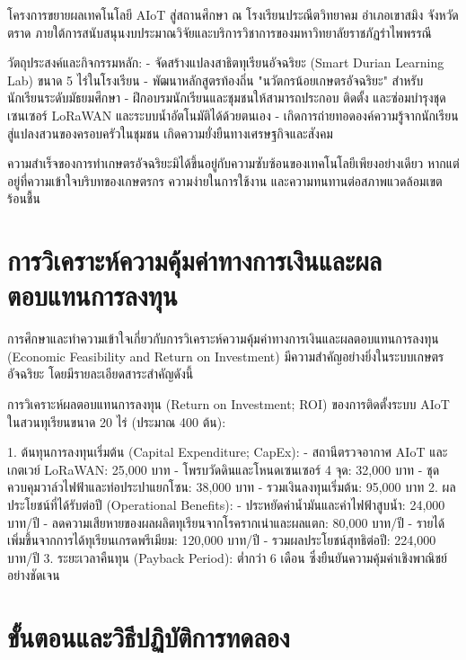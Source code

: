 โครงการขยายผลเทคโนโลยี AIoT สู่สถานศึกษา ณ โรงเรียนประณีตวิทยาคม อำเภอเขาสมิง จังหวัดตราด ภายใต้การสนับสนุนงบประมาณวิจัยและบริการวิชาการของมหาวิทยาลัยราชภัฏรำไพพรรณี

วัตถุประสงค์และกิจกรรมหลัก:
- จัดสร้างแปลงสาธิตทุเรียนอัจฉริยะ (Smart Durian Learning Lab) ขนาด 5 ไร่ในโรงเรียน
- พัฒนาหลักสูตรท้องถิ่น "นวัตกรน้อยเกษตรอัจฉริยะ" สำหรับนักเรียนระดับมัธยมศึกษา
- ฝึกอบรมนักเรียนและชุมชนให้สามารถประกอบ ติดตั้ง และซ่อมบำรุงชุดเซนเซอร์ LoRaWAN และระบบน้ำอัตโนมัติได้ด้วยตนเอง
- เกิดการถ่ายทอดองค์ความรู้จากนักเรียนสู่แปลงสวนของครอบครัวในชุมชน เกิดความยั่งยืนทางเศรษฐกิจและสังคม

\begin{casebox}
ความสำเร็จของการทำเกษตรอัจฉริยะมิได้ขึ้นอยู่กับความซับซ้อนของเทคโนโลยีเพียงอย่างเดียว หากแต่อยู่ที่ความเข้าใจบริบทของเกษตรกร ความง่ายในการใช้งาน และความทนทานต่อสภาพแวดล้อมเขตร้อนชื้น
\end{casebox}

\section{การวิเคราะห์ความคุ้มค่าทางการเงินและผลตอบแทนการลงทุน}

การศึกษาและทำความเข้าใจเกี่ยวกับการวิเคราะห์ความคุ้มค่าทางการเงินและผลตอบแทนการลงทุน (Economic Feasibility and Return on Investment) มีความสำคัญอย่างยิ่งในระบบเกษตรอัจฉริยะ โดยมีรายละเอียดสาระสำคัญดังนี้

การวิเคราะห์ผลตอบแทนการลงทุน (Return on Investment; ROI) ของการติดตั้งระบบ AIoT ในสวนทุเรียนขนาด 20 ไร่ (ประมาณ 400 ต้น):

1. ต้นทุนการลงทุนเริ่มต้น (Capital Expenditure; CapEx):
   - สถานีตรวจอากาศ AIoT และเกตเวย์ LoRaWAN: 25,000 บาท
   - โพรบวัดดินและโหนดเซนเซอร์ 4 จุด: 32,000 บาท
   - ชุดควบคุมวาล์วไฟฟ้าและท่อประปาแยกโซน: 38,000 บาท
   - รวมเงินลงทุนเริ่มต้น: 95,000 บาท
2. ผลประโยชน์ที่ได้รับต่อปี (Operational Benefits):
   - ประหยัดค่าน้ำมันและค่าไฟฟ้าสูบน้ำ: 24,000 บาท/ปี
   - ลดความเสียหายของผลผลิตทุเรียนจากโรครากเน่าและผลแตก: 80,000 บาท/ปี
   - รายได้เพิ่มขึ้นจากการได้ทุเรียนเกรดพรีเมียม: 120,000 บาท/ปี
   - รวมผลประโยชน์สุทธิต่อปี: 224,000 บาท/ปี
3. ระยะเวลาคืนทุน (Payback Period): ต่ำกว่า 6 เดือน ซึ่งยืนยันความคุ้มค่าเชิงพาณิชย์อย่างชัดเจน

\section{ขั้นตอนและวิธีปฏิบัติการทดลอง}


